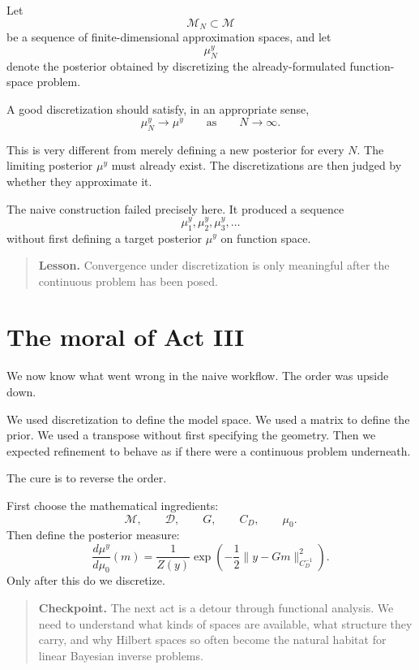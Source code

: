 \documentclass[11pt,a4paper]{book}
\newenvironment{lesson}
  {\begin{quote}\textbf{Lesson.}}
  {\end{quote}}
\newenvironment{checkpoint}
  {\begin{quote}\textbf{Checkpoint.}}
  {\end{quote}}
\newcommand{\M}{\mathcal{M}}      %
\newcommand{\D}{\mathcal{D}}      %
\newcommand{\prior}{\mu_0}
\newcommand{\post}{\mu^y}
\newcommand{\obs}{y}
\newcommand{\G}{G}
\begin{document}
Let
\[
    \M_N \subset \M
\]
be a sequence of finite-dimensional approximation spaces, and let
\[
    \post_N
\]
denote the posterior obtained by discretizing the already-formulated
function-space problem.

A good discretization should satisfy, in an appropriate sense,
\[
    \post_N \to \post
    \qquad
    \text{as}
    \qquad
    N\to\infty.
\]

This is very different from merely defining a new posterior for every $N$.
The limiting posterior $\post$ must already exist. The discretizations are then
judged by whether they approximate it.

The naive construction failed precisely here. It produced a sequence
\[
    \post_1,\post_2,\post_3,\ldots
\]
without first defining a target posterior $\post$ on function space.

\begin{lesson}
Convergence under discretization is only meaningful after the continuous problem
has been posed.
\end{lesson}

\section{The moral of Act III}

We now know what went wrong in the naive workflow. The order was upside down.

We used discretization to define the model space. We used a matrix to define
the prior. We used a transpose without first specifying the geometry. Then we
expected refinement to behave as if there were a continuous problem underneath.

The cure is to reverse the order.

First choose the mathematical ingredients:
\[
    \M,\qquad
    \D,\qquad
    \G,\qquad
    C_D,\qquad
    \prior.
\]
Then define the posterior measure:
\[
    \frac{d\post}{d\prior}(m)
    =
    \frac{1}{Z(\obs)}
    \exp
    \left(
        -
        \frac{1}{2}
        \|\obs-\G m\|_{C_D^{-1}}^2
    \right).
\]
Only after this do we discretize.

\begin{checkpoint}
The next act is a detour through functional analysis. We need to understand
what kinds of spaces are available, what structure they carry, and why Hilbert
spaces so often become the natural habitat for linear Bayesian inverse
problems.
\end{checkpoint}
\end{document}
